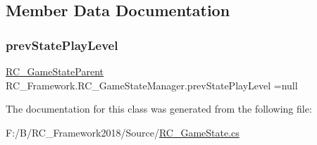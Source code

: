 \subsection{Member Data Documentation}
\mbox{\label{class_r_c___framework_1_1_r_c___game_state_manager_a36d7fc859f13ad252673c0fae038c8b7}} 
\subsubsection{\texorpdfstring{prev\+State\+Play\+Level}{prevStatePlayLevel}}
{\footnotesize\ttfamily \mbox{\hyperlink{class_r_c___framework_1_1_r_c___game_state_parent}{R\+C\+\_\+\+Game\+State\+Parent}} R\+C\+\_\+\+Framework.\+R\+C\+\_\+\+Game\+State\+Manager.\+prev\+State\+Play\+Level =null}



The documentation for this class was generated from the following file\+:\begin{DoxyCompactItemize}
\item 
F\+:/\+B/\+R\+C\+\_\+\+Framework2018/\+Source/\mbox{\hyperlink{_r_c___game_state_8cs}{R\+C\+\_\+\+Game\+State.\+cs}}\end{DoxyCompactItemize}
